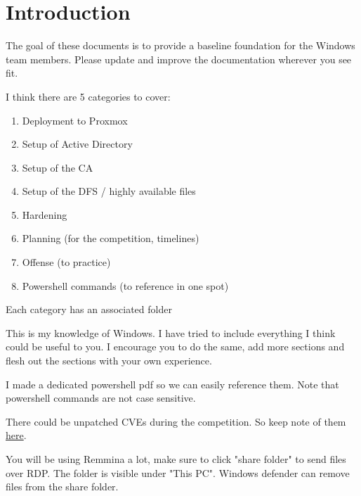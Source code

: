 \documentclass{article}
\begin{document}
\graphicspath{ {./Images/} }
\tableofcontents

\section{Introduction}
The goal of these documents is to provide a baseline foundation for the Windows team members.
Please update and improve the documentation wherever you see fit.

I think there are 5 categories to cover:

\begin{enumerate}
        \item Deployment to Proxmox
        \item Setup of Active Directory
        \item Setup of the CA
        \item Setup of the DFS / highly available files
        \item Hardening
        \item Planning (for the competition, timelines)
        \item Offense (to practice)
        \item Powershell commands (to reference in one spot)
\end{enumerate}

Each category has an associated folder

This is my knowledge of Windows. I have tried to include everything I think could be useful to you.
I encourage you to do the same, add more sections and flesh out the sections with your own experience.

I made a dedicated powershell pdf so we can easily reference them.
Note that powershell commands are not case sensitive.

There could be unpatched CVEs during the competition. So keep note of them \href{https://stack.watch/product/microsoft/windows-server-2019/}{here}.

You will be using Remmina a lot, make sure to click "share folder" to send files over RDP.
The folder is visible under "This PC".
Windows defender can remove files from the share folder.
\end{document}
